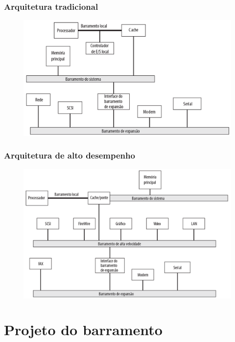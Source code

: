 \documentclass[aspectratio=169,
				xcolor=table]{beamer}
\begin{document}
	\begin{frame}
		\frametitle{Arquitetura tradicional}
		\begin{figure}[hbtp]
		\centering
		\includegraphics[height=.75\textheight]{../figs/cap11/arquitetura1.png}
		\end{figure}
	\end{frame}
	
	\begin{frame}
		\frametitle{Arquitetura de alto desempenho}
		\begin{figure}[hbtp]
		\centering
		\includegraphics[height=.75\textheight]{../figs/cap11/arquitetura2.png}
		\end{figure}
	\end{frame}		
		
	\section{Projeto do barramento}
	
\end{document}
